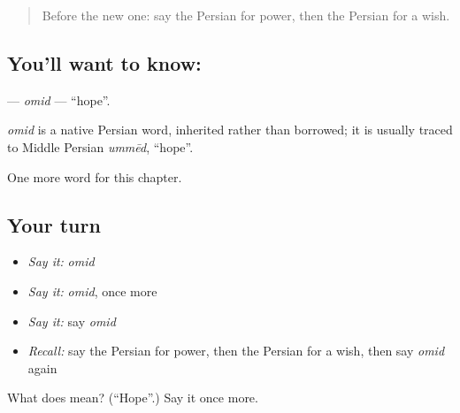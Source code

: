 \begin{quote}
Before the new one: say the Persian for power, then the Persian for a wish.
\end{quote}

\subsection*{You'll want to know: }
\textbf{} — \emph{omid} — \textquotedblleft{}hope\textquotedblright{}.

\begin{cousinweb}
\emph{omid} is a native Persian word, inherited rather than borrowed; it is usually traced to Middle Persian \emph{ummēd}, \textquotedblleft{}hope\textquotedblright{}.
\end{cousinweb}

\begin{grammarlens}[title={What you've built}]
One more word for this chapter.
\end{grammarlens}

\subsection*{Your turn}
\begin{itemize}
\raggedright
  \item \emph{Say it:} \emph{omid}
  \item \emph{Say it:} \emph{omid}, once more
  \item \emph{Say it:} say \emph{omid}
  \item \emph{Recall:} say the Persian for power, then the Persian for a wish, then say \emph{omid} again
\end{itemize}

\begin{tcolorbox}[breakable,colback=teal!4,colframe=teal!35!black,title={Before you move on}]
What does  mean? (\textquotedblleft{}Hope\textquotedblright{}.) Say it once more.
\end{tcolorbox}
